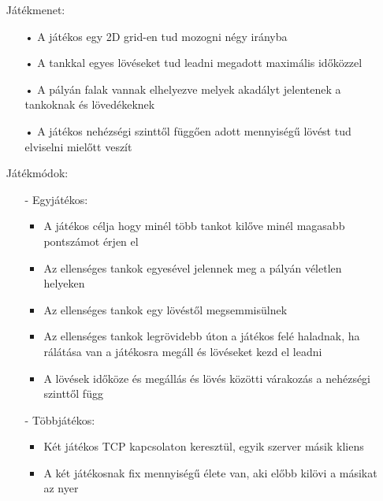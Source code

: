 \documentclass[12pt]{article}
\begin{document}
\begin{itemize}

\item[] Játékmenet:

\begin{itemize}
\item[•] A játékos egy 2D grid-en tud mozogni négy irányba
\item[•] A tankkal egyes lövéseket tud leadni megadott maximális időközzel
\item[•] A pályán falak vannak elhelyezve melyek akadályt jelentenek a tankoknak és lövedékeknek
\item[•] A játékos nehézségi szinttől függően adott mennyiségű lövést tud elviselni mielőtt veszít
\end{itemize}

\item[] Játékmódok:

\begin{itemize}

\item[-] Egyjátékos:
\begin{itemize}
\item A játékos célja hogy minél több tankot kilőve minél magasabb pontszámot érjen el
\item Az ellenséges tankok egyesével jelennek meg a pályán véletlen helyeken
\item Az ellenséges tankok egy lövéstől megsemmisülnek
\item Az ellenséges tankok legrövidebb úton a játékos felé haladnak, ha rálátása van a játékosra megáll és lövéseket kezd el leadni
\item A lövések időköze és megállás és lövés közötti várakozás a nehézségi szinttől függ
\end{itemize}
\item[-] Többjátékos:
\begin{itemize}
\item Két játékos TCP kapcsolaton keresztül, egyik szerver másik kliens
\item A két játékosnak fix mennyiségű élete van, aki előbb kilövi a másikat az nyer
\end{itemize}

\end{itemize}

\end{itemize}
\end{document}
